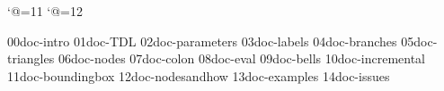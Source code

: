 









\sstitles


\catcode`@=11
\let\ling@getpars=\@getoptionalarg
\let\pst@pars=\@optionalarg
\catcode`@=12


\get 00doc-intro
\get 01doc-TDL
\get 02doc-parameters
\get 03doc-labels
\get 04doc-branches
\get 05doc-triangles
\get 06doc-nodes
\get 07doc-colon
\get 08doc-eval
\get 09doc-bells
\get 10doc-incremental
\get 11doc-boundingbox
\get 12doc-nodesandhow
\get 13doc-examples
\get 14doc-issues
%
%

%

\bye


